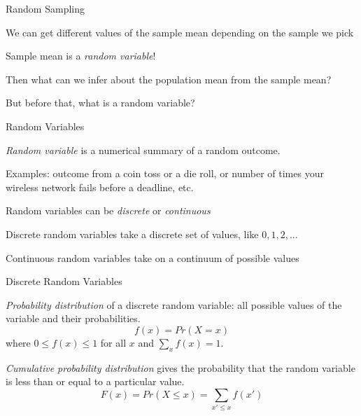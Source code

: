\documentclass{./../div_teaching_slides}
\begin{document}
\begin{frame}{Random Sampling}
\begin{witemize}
\item We can get different values of the sample mean depending on the sample we pick
\item Sample mean is a \textit{random variable}!
\item Then what can we infer about the population mean from the sample mean?
\item But before that, what is a random variable?
\end{witemize}
\end{frame}


\begin{frame}{Random Variables}
\begin{witemize}
  \item \textit{Random variable} is a numerical summary of a random outcome. 
  \item Examples:  outcome from a coin toss or a die roll, or number of times your wireless network fails before a deadline, etc.
  \item Random variables can be \textit{discrete} or \textit{continuous}
  \item Discrete random variables take a discrete set of values, like $0, 1, 2,...$
  \item Continuous random variables take on a continuum of possible values
\end{witemize}
\end{frame}

\begin{frame}{Discrete Random Variables}
\begin{witemize}
  \item \textit{Probability distribution} of a discrete random variable: all possible values of the variable and their probabilities. 
$$ f(x) = Pr(X=x) $$
where $0 \leq f(x) \leq 1$ for all $x$ and $\sum_x f(x) = 1$.

\vspace{1em}
\item \textit{Cumulative probability distribution} gives the probability that the random variable is less than or equal to a particular value.
$$ F(x) = Pr(X \leq x) = \sum_{x' \leq x} f(x') $$ \\
\end{witemize}
\end{frame}
\end{document}
